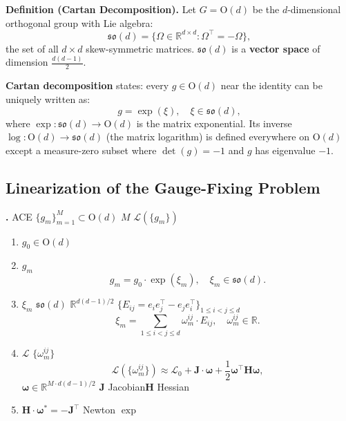 \documentclass[11pt,a4paper]{article}
\theoremstyle{plain}
\theoremstyle{definition}
\theoremstyle{remark}
\newcommand{\R}{\mathbb{R}}
\newcommand{\so}{\mathfrak{so}}
\begin{document}
\bigskip
\noindent
\textbf{Definition (Cartan Decomposition).}
Let $G = \mathrm{O}(d)$ be the $d$-dimensional orthogonal group with Lie algebra:
\begin{equation}
  \so(d) = \{ \Omega \in \R^{d \times d} : \Omega^\top = -\Omega \},
\end{equation}
the set of all $d \times d$ skew-symmetric matrices. $\so(d)$ is a
\textbf{vector space} of dimension $\frac{d(d-1)}{2}$.

\textbf{Cartan decomposition} states: every $g \in \mathrm{O}(d)$ near the
identity can be uniquely written as:
\begin{equation}
  g = \exp(\xi), \quad \xi \in \so(d),
\end{equation}
where $\exp: \so(d) \to \mathrm{O}(d)$ is the matrix exponential. Its
inverse $\log: \mathrm{O}(d) \to \so(d)$ (the matrix logarithm) is
defined everywhere on $\mathrm{O}(d)$ except a measure-zero subset
where $\det(g) = -1$ and $g$ has eigenvalue $-1$.

\subsection{}
\subsection*{Linearization of the Gauge-Fixing Problem}

\noindent
\textbf{.}
 ACE  $\{g_m\}_{m=1}^M \subset \mathrm{O}(d)$
 $M$ 
$\mathcal{L}(\{g_m\})$

\textbf{}

\begin{enumerate}[label=\textbf{ \arabic*}:, leftmargin=*]
  \item  $g_0 \in \mathrm{O}(d)$
  \item  $g_m$ 
        \begin{equation}\label{eq:param}
          g_m = g_0 \cdot \exp(\xi_m), \quad \xi_m \in \so(d).
        \end{equation}
  \item  $\xi_m$ $\so(d)$  $\R^{d(d-1)/2}$
         $\{E_{ij} = e_i e_j^\top - e_j e_i^\top\}_{1 \leq i < j \leq d}$
        \begin{equation}\label{eq:basis}
          \xi_m = \sum_{1 \leq i < j \leq d} \omega_m^{ij} \cdot E_{ij},
          \quad \omega_m^{ij} \in \R.
        \end{equation}
  \item  $\mathcal{L}$  $\{\omega_m^{ij}\}$ 
        \begin{equation}\label{eq:expand}
          \mathcal{L}(\{\omega_m^{ij}\}) \approx
          \mathcal{L}_0 + \mathbf{J} \cdot \bm{\omega} + \frac{1}{2} \bm{\omega}^\top \mathbf{H} \bm{\omega},
        \end{equation}
         $\bm{\omega} \in \R^{M \cdot d(d-1)/2}$ 
        $\mathbf{J}$ Jacobian$\mathbf{H}$  Hessian
  \item  $\mathbf{H} \cdot \bm{\omega}^* = -\mathbf{J}^\top$ 
        Newton  $\exp$ 
\end{enumerate}
\end{document}
